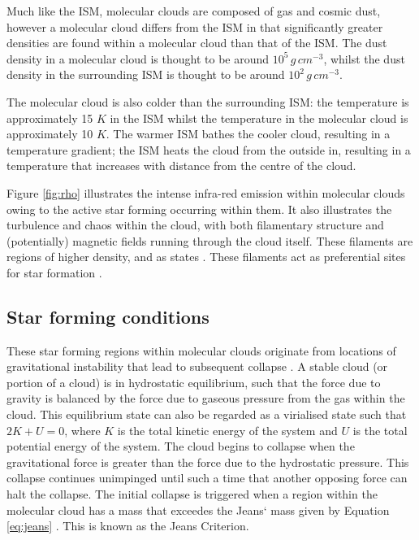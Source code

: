 \documentclass{report}
\begin{document}
Much like the ISM, molecular clouds are composed of gas and cosmic dust, however a molecular cloud differs from the ISM in that significantly greater densities are found within a molecular cloud than that of the ISM. The dust density in a molecular cloud is thought to be around $10^{5}\,g\,cm^{-3}$, whilst the dust density in the surrounding ISM is thought to be around $10^{2}\,g\,cm^{-3}$.

The molecular cloud is also colder than the surrounding ISM: the temperature is approximately 15 $K$ in the ISM whilst the temperature in the molecular cloud is approximately 10 $K$. The warmer ISM bathes the cooler cloud, resulting in a temperature gradient; the ISM heats the cloud from the outside in, resulting in a temperature that increases with distance from the centre of the cloud.

Figure \ref{fig:rho} illustrates the intense infra-red emission within molecular clouds owing to the active star forming occurring within them. It also illustrates the turbulence and chaos within the cloud, with both filamentary structure and (potentially) magnetic fields running through the cloud itself. These filaments are regions of higher density, and as \textcite{evo-mol} states . These filaments act as preferential sites for star formation \parencite{filaments}.

\subsection{Star forming conditions} \label{sec:conditions}
These star forming regions within molecular clouds originate from locations of gravitational instability that lead to subsequent collapse \parencite{jeans}. A stable cloud (or portion of a cloud) is in hydrostatic equilibrium, such that the force due to gravity is balanced by the force due to gaseous pressure from the gas within the cloud. This equilibrium state can also be regarded as a virialised state such that $2K+U=0$, where $K$ is the total kinetic energy of the system and $U$ is the total potential energy of the system. The cloud begins to collapse when the gravitational force is greater than the force due to the hydrostatic pressure. This collapse continues unimpinged until such a time that another opposing force can halt the collapse. The initial collapse is triggered when a region within the molecular cloud has a mass that exceedes the Jeans` mass given by Equation \ref{eq:jeans} \parencite{lecture}. This is known as the Jeans Criterion.
\end{document}
